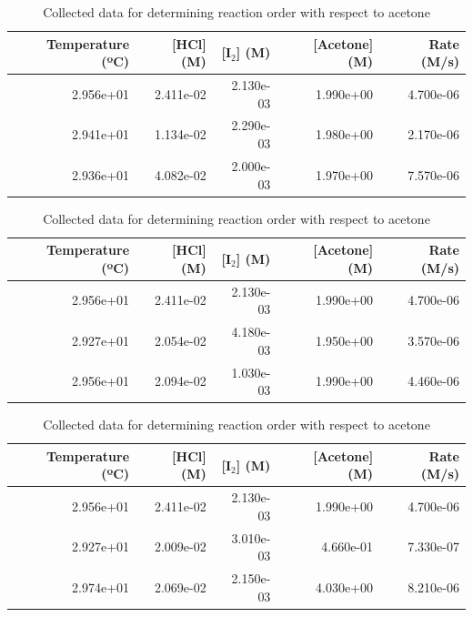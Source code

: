 \begin{table}[H]
\centering
\caption{Experimental data for iodination of acetone under varying conditions.}

\begin{subtable}{\textwidth}
\centering
\caption{Collected data for determining reaction order with respect to hydrochloric acid.}
\begin{tabular}{rrrrr}
\toprule
Temperature (ºC) & [HCl] (M) & [I$_2$] (M) & [Acetone] (M) & Rate (M/s) \\
\midrule
2.956e+01 & 2.411e-02 & 2.130e-03 & 1.990e+00 & 4.700e-06 \\
2.941e+01 & 1.134e-02 & 2.290e-03 & 1.980e+00 & 2.170e-06 \\
2.936e+01 & 4.082e-02 & 2.000e-03 & 1.970e+00 & 7.570e-06 \\
\bottomrule
\end{tabular}
\end{subtable}

\vspace{0.75em}

\begin{subtable}{\textwidth}
\centering
\caption{Collected data for determining reaction order with respect to iodine}
\begin{tabular}{rrrrr}
\toprule
Temperature (ºC) & [HCl] (M) & [I$_2$] (M) & [Acetone] (M) & Rate (M/s) \\
\midrule
2.956e+01 & 2.411e-02 & 2.130e-03 & 1.990e+00 & 4.700e-06 \\
2.927e+01 & 2.054e-02 & 4.180e-03 & 1.950e+00 & 3.570e-06 \\
2.956e+01 & 2.094e-02 & 1.030e-03 & 1.990e+00 & 4.460e-06 \\
\bottomrule
\end{tabular}
\end{subtable}

\vspace{0.75em}

\begin{subtable}{\textwidth}
\centering
\caption{Collected data for determining reaction order with respect to acetone}
\begin{tabular}{rrrrr}
\toprule
Temperature (ºC) & [HCl] (M) & [I$_2$] (M) & [Acetone] (M) & Rate (M/s) \\
\midrule
2.956e+01 & 2.411e-02 & 2.130e-03 & 1.990e+00 & 4.700e-06 \\
2.927e+01 & 2.009e-02 & 3.010e-03 & 4.660e-01 & 7.330e-07 \\
2.974e+01 & 2.069e-02 & 2.150e-03 & 4.030e+00 & 8.210e-06 \\
\bottomrule
\end{tabular}
\end{subtable}

\end{table}




